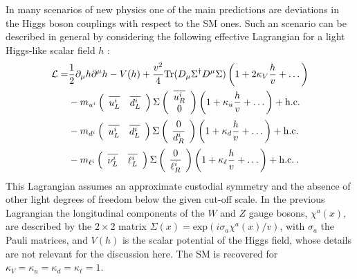 \documentclass[preprint,3p,12pt]{elsarticle}
\begin{document}
In many scenarios of new physics one of the main predictions are deviations in the Higgs boson couplings with respect to the SM ones. Such an scenario can be described in general by considering the following effective Lagrangian for a light Higgs-like scalar field $h$ \cite{Contino:2010mh,Azatov:2012bz}:
%
\begin{equation}
\begin{split}
{\cal L}=&\frac 12 \partial_\mu h \partial^\mu h - V(h) + \frac{v^2}{4} \mathrm{Tr}(D_\mu \Sigma^\dagger D^\mu\Sigma)\left(1+2\kappa_V\frac{h}{v}+\dots\right)\\
%
&-m_{u^i} \left(\begin{array}{c c}\overline{u_L^i}&\overline{d_L^i}\end{array}\right) \Sigma \left(\begin{array}{c}\overline{u_R^i}\\ 0 \end{array}\right) \left(1+ \kappa_u \frac{h}{v}+\dots \right) +\mathrm{h.c.}\\
%
&-m_{d^i} \left(\begin{array}{c c}\overline{u_L^i}&\overline{d_L^i}\end{array}\right) \Sigma \left(\begin{array}{c}0\\ \overline{d_R^i} \end{array}\right) \left(1+ \kappa_d \frac{h}{v}+\dots \right) +\mathrm{h.c.}\\
%
&-m_{\ell^i} \left(\begin{array}{c c}\overline{\nu_L^i}&\overline{\ell_L^i}\end{array}\right) \Sigma \left(\begin{array}{c} 0\\ \overline{\ell_R^i}\end{array}\right) \left(1+ \kappa_\ell \frac{h}{v}+\dots \right) +\mathrm{h.c.}~\!.
\label{eq:Lagh}
\end{split}
\end{equation}
%
This Lagrangian assumes an approximate custodial symmetry and the absence of other light degrees of freedom below the given cut-off scale. In the previous Lagrangian the longitudinal components of the $W$ and $Z$ gauge bosons, $\chi^a(x)$, are described by the $2\times 2$ matrix $\Sigma(x)=\mathrm{exp}\left( i \sigma_a \chi^a(x)/v\right)$, with $\sigma_a$ the Pauli matrices, and $V(h)$ is the scalar potential of the Higgs field, whose details are not relevant for the discussion here. The SM is recovered for $\kappa_V=\kappa_u=\kappa_d=\kappa_\ell=1$. 
\end{document}
